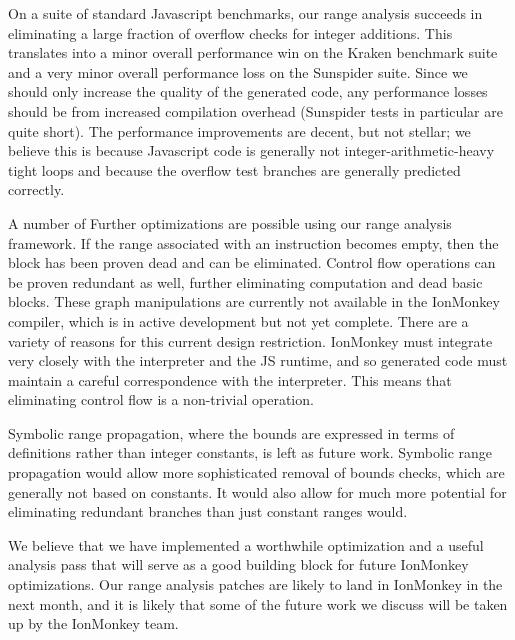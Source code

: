 \documentclass{article}
\begin{document}
On a suite of standard Javascript benchmarks, our range analysis
succeeds in eliminating a large fraction of overflow checks for
integer additions. This translates into a minor overall performance
win on the Kraken benchmark suite and a very minor overall performance
loss on the Sunspider suite. Since we should only increase the
quality of the generated code, any performance losses should be from
increased compilation overhead (Sunspider tests in particular are
quite short). The performance improvements are decent, but not
stellar; we believe this is because Javascript code is generally not
integer-arithmetic-heavy tight loops and because the overflow test
branches are generally predicted correctly.

A number of Further optimizations are possible using our range analysis
framework. If the range associated with an instruction becomes empty, then the
block has been proven dead and can be eliminated. Control flow operations can
be proven redundant as well, further eliminating computation and dead basic
blocks. These graph manipulations are currently not available in the IonMonkey
compiler, which is in active development but not yet complete. There are a
variety of reasons for this current design restriction. IonMonkey must
integrate very closely with the interpreter and the JS runtime, and so
generated code must maintain a careful correspondence with the interpreter.
This means that eliminating control flow is a non-trivial
operation\cite{dvander}.

Symbolic range propagation, where the bounds are expressed in terms of
definitions rather than integer constants, is left as future
work. Symbolic range propagation would allow more sophisticated
removal of bounds checks, which are generally not based on
constants. It would also allow for much more potential for eliminating
redundant branches than just constant ranges would.

We believe that we have implemented a worthwhile optimization and a
useful analysis pass that will serve as a good building block for
future IonMonkey optimizations. Our range analysis patches are likely
to land in IonMonkey in the next month, and it is likely that some of
the future work we discuss will be taken up by the IonMonkey team.

{}

\end{document}
